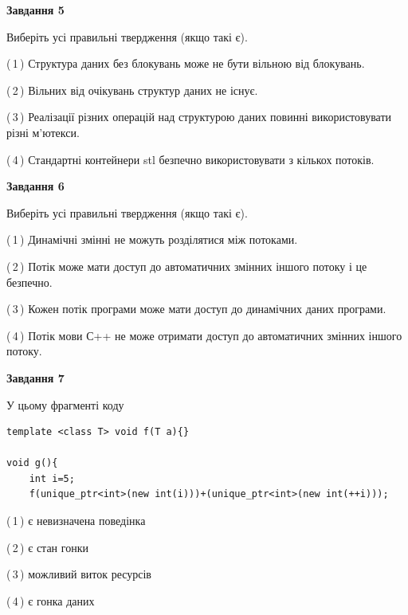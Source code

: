 \documentclass[12pt, ukrainian]{article}
\begin{document}
\begin {large}
{\begin{center}
\textbf{Завдання 5}
\end{center}

Виберіть усі правильні твердження (якщо такі є).\par
\vspace{2mm}

(\,1\,) Структура даних без блокувань може не бути вільною від блокувань.%

(\,2\,) Вільних від очікувань структур даних не існує.%

(\,3\,) Реалізації різних операцій над структурою даних повинні використовувати різні м’ютекси.%

(\,4\,) Стандартні контейнери stl безпечно використовувати з кількох потоків.%
\newpage


\begin{center}
\textbf{Завдання 6}
\end{center}

Виберіть усі правильні твердження (якщо такі є).\par
\vspace{2mm}

(\,1\,) Динамічні змінні не можуть розділятися між потоками.%

(\,2\,) Потік може мати доступ до автоматичних змінних іншого потоку і це безпечно.%

(\,3\,) Кожен потік програми може мати доступ до динамічних даних програми.%

(\,4\,) Потік мови С++ не може отримати доступ до автоматичних змінних іншого потоку.%


\begin{center}
\textbf{Завдання 7}
\end{center}

У цьому фрагменті коду
\begin{verbatim}
template <class T> void f(T a){}

void g(){
    int i=5;
    f(unique_ptr<int>(new int(i)))+(unique_ptr<int>(new int(++i)));
\end{verbatim}
(\,1\,) є невизначена поведінка%

(\,2\,) є стан гонки%

(\,3\,) можливий виток ресурсів%

(\,4\,) є гонка даних%

}
\end {large}

\vspace{4mm}
\newpage
\end{document}
